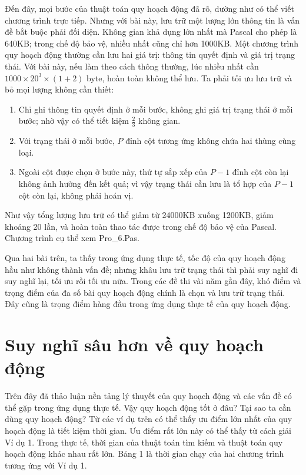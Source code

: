 \documentclass[11pt]{article}
\begin{document}
Đến đây, mọi bước của thuật toán quy hoạch động đã rõ, dường như có thể viết
chương trình trực tiếp. Nhưng với bài này, lưu trữ một lượng lớn thông tin là
vấn đề bắt buộc phải đối diện. Không gian khả dụng lớn nhất mà Pascal cho phép
là 640KB; trong chế độ bảo vệ, nhiều nhất cũng chỉ hơn 1000KB. Một chương
trình quy hoạch động thường cần lưu hai giá trị: thông tin quyết định và giá
trị trạng thái. Với bài này, nếu làm theo cách thông thường, lúc nhiều nhất
cần \(1000\times 20^3\times (1+2)\) byte, hoàn toàn không thể lưu. Ta phải
tối ưu lưu trữ và bỏ mọi lượng không cần thiết:
\begin{enumerate}
  \item Chỉ ghi thông tin quyết định ở mỗi bước, không ghi giá trị trạng thái
  ở mỗi bước; nhờ vậy có thể tiết kiệm \(\frac{2}{3}\) không gian.
  \item Với trạng thái ở mỗi bước, \(P\) đỉnh cột tương ứng không chứa hai
  thùng cùng loại.
  \item Ngoài cột được chọn ở bước này, thứ tự sắp xếp của \(P-1\) đỉnh cột
  còn lại không ảnh hưởng đến kết quả; vì vậy trạng thái cần lưu là tổ hợp
  của \(P-1\) cột còn lại, không phải hoán vị.
\end{enumerate}

Như vậy tổng lượng lưu trữ có thể giảm từ 24000KB xuống 1200KB, giảm khoảng
20 lần, và hoàn toàn thao tác được trong chế độ bảo vệ của Pascal. Chương
trình cụ thể xem Pro\_6.Pas.

Qua hai bài trên, ta thấy trong ứng dụng thực tế, tốc độ của quy hoạch động
hầu như không thành vấn đề; nhưng khâu lưu trữ trạng thái thì phải suy nghĩ
đi suy nghĩ lại, tối ưu rồi tối ưu nữa. Trong các đề thi vài năm gần đây, khó
điểm và trọng điểm của đa số bài quy hoạch động chính là chọn và lưu trữ
trạng thái. Đây cũng là trọng điểm hàng đầu trong ứng dụng thực tế của quy
hoạch động.

\section{Suy nghĩ sâu hơn về quy hoạch động}

Trên đây đã thảo luận nền tảng lý thuyết của quy hoạch động và các vấn đề có
thể gặp trong ứng dụng thực tế. Vậy quy hoạch động tốt ở đâu? Tại sao ta cần
dùng quy hoạch động? Từ các ví dụ trên có thể thấy ưu điểm lớn nhất của quy
hoạch động là tiết kiệm thời gian. Ưu điểm rất lớn này có thể thấy từ cách
giải Ví dụ 1. Trong thực tế, thời gian của thuật toán tìm kiếm và thuật toán
quy hoạch động khác nhau rất lớn. Bảng 1 là thời gian chạy của hai chương
trình tương ứng với Ví dụ 1.
\end{document}
